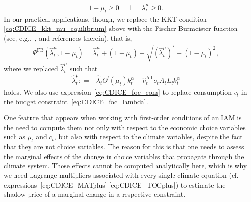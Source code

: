 \documentclass[11pt, a4paper, pdftex, twoside, dvipsnames]{article}
\newcommand{\defeq}{\mathrel{\mathop:}=}
\begin{document}
\begin{appendices}
\begin{align}
  \label{eq:CDICE_kkt_mu_equilibrium}
  1 - \mu_{t} \geq 0 \quad \perp \quad \lambda^{\mu}_{t} \geq 0.
\end{align}
%
In our practical applications, though, we replace the KKT condition \cref{eq:CDICE_kkt_mu_equilibrium} above with the Fischer-Burmeister function (see, e.g.,~\citet{Maliar2019}, and references therein), that is,
%
\begin{align}
  \label{eq:kkt_FB}
  \Psi^{\text{FB}}\left(\hat{\lambda}^{\mu}_{t}, 1-\mu_{t}\right) =
  \hat{\lambda}^{\mu}_{t} + \left(1 - \mu_{t}\right) -
  \sqrt{\left(\hat{\lambda}^{\mu}_{t} \right)^2 + \left(1-\mu_{t}\right)^{2}},
\end{align}
%
where we replaced 
%
$\hat{\lambda}^{\mu}_{t}$ such that
\begin{align}
  \label{eq:lambda_mu_def}
  \hat{\lambda}^{\mu}_{t} \defeq -\hat{\lambda}_t \Theta^{\prime}\left(\mu_{t}\right) k_t^{\alpha}  - \hat{\nu}_t^{\text{AT}} \sigma_t A_{t}L_{t}k_{t}^{\alpha} 
\end{align}
%
holds.
%
We also use expression~\eqref{eq:CDICE_foc_cons}  to replace consumption $c_t$ in the budget constraint~\eqref{eq:CDICE_foc_lambda}.

One feature that appears when working with first-order conditions of an IAM is the need to compute them not only with respect to the economic choice variables such as $\mu_t$ and $c_t$, but also with respect to the climate variables, despite the fact that they are not choice variables. The reason for this is that one needs to assess the marginal effects of the change in choice variables that propagate through the climate system. Those effects cannot be computed analytically here, which is why we need Lagrange multipliers associated with every single climate equation (cf. expressions~\eqref{eq:CDICE_MATplus}-\eqref{eq:CDICE_TOCplus}) to estimate the shadow price of a marginal change in a respective constraint.



\end{appendices}
\end{document}
